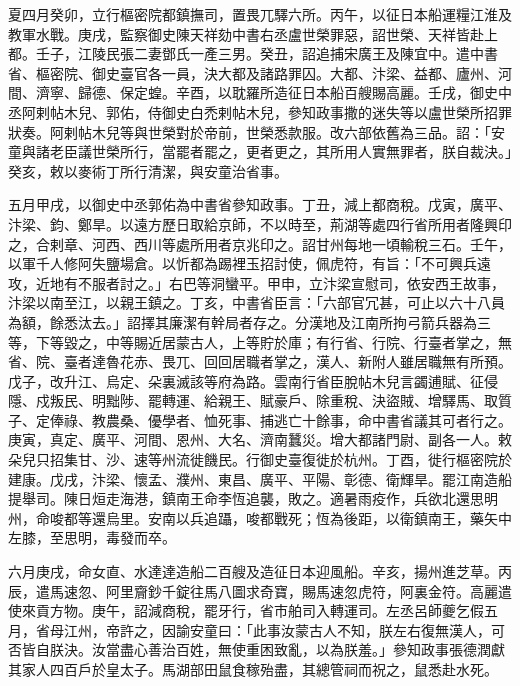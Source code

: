 \begin{pinyinscope}
 夏四月癸卯，立行樞密院都鎮撫司，置畏兀驛六所。丙午，以征日本船運糧江淮及教軍水戰。庚戌，監察御史陳天祥劾中書右丞盧世榮罪惡，詔世榮、天祥皆赴上都。壬子，江陵民張二妻鄧氏一產三男。癸丑，詔追捕宋廣王及陳宜中。遣中書省、樞密院、御史臺官各一員，決大都及諸路罪囚。大都、汴梁、益都、廬州、河間、濟寧、歸德、保定蝗。辛酉，以耽羅所造征日本船百艘賜高麗。壬戌，御史中丞阿剌帖木兒、郭佑，侍御史白禿剌帖木兒，參知政事撒的迷失等以盧世榮所招罪狀奏。阿剌帖木兒等與世榮對於帝前，世榮悉款服。改六部依舊為三品。詔：「安童與諸老臣議世榮所行，當罷者罷之，更者更之，其所用人實無罪者，朕自裁決。」癸亥，敕以麥術丁所行清潔，與安童治省事。



 五月甲戌，以御史中丞郭佑為中書省參知政事。丁丑，減上都商稅。戊寅，廣平、汴梁、鈞、鄭旱。以遠方歷日取給京師，不以時至，荊湖等處四行省所用者隆興印之，合剌章、河西、西川等處所用者京兆印之。詔甘州每地一頃輸稅三石。壬午，以軍千人修阿失鹽場倉。以忻都為踢裡玉招討使，佩虎符，有旨：「不可興兵遠攻，近地有不服者討之。」右巴等洞蠻平。甲申，立汴梁宣慰司，依安西王故事，汴梁以南至江，以親王鎮之。丁亥，中書省臣言：「六部官冗甚，可止以六十八員為額，餘悉汰去。」詔擇其廉潔有幹局者存之。分漢地及江南所拘弓箭兵器為三等，下等毀之，中等賜近居蒙古人，上等貯於庫；有行省、行院、行臺者掌之，無省、院、臺者達魯花赤、畏兀、回回居職者掌之，漢人、新附人雖居職無有所預。戊子，改升江、烏定、朵裏滅該等府為路。雲南行省臣脫帖木兒言蠲逋賦、征侵隱、戍叛民、明黜陟、罷轉運、給親王、賦豪戶、除重稅、決盜賊、增驛馬、取質子、定俸祿、教農桑、優學者、恤死事、捕逃亡十餘事，命中書省議其可者行之。庚寅，真定、廣平、河間、恩州、大名、濟南蠶災。增大都諸門尉、副各一人。敕朵兒只招集甘、沙、速等州流徙饑民。行御史臺復徙於杭州。丁酉，徙行樞密院於建康。戊戌，汴梁、懷孟、濮州、東昌、廣平、平陽、彰德、衛輝旱。罷江南造船提舉司。陳日烜走海港，鎮南王命李恆追襲，敗之。適暑雨疫作，兵欲北還思明州，命唆都等還烏里。安南以兵追躡，唆都戰死；恆為後距，以衛鎮南王，藥矢中左膝，至思明，毒發而卒。



 六月庚戌，命女直、水達達造船二百艘及造征日本迎風船。辛亥，揚州進芝草。丙辰，遣馬速忽、阿里齎鈔千錠往馬八圖求奇寶，賜馬速忽虎符，阿裏金符。高麗遣使來貢方物。庚午，詔減商稅，罷牙行，省市舶司入轉運司。左丞呂師夔乞假五月，省母江州，帝許之，因諭安童曰：「此事汝蒙古人不知，朕左右復無漢人，可否皆自朕決。汝當盡心善治百姓，無使重困致亂，以為朕羞。」參知政事張德潤獻其家人四百戶於皇太子。馬湖部田鼠食稼殆盡，其總管祠而祝之，鼠悉赴水死。




\end{pinyinscope}
